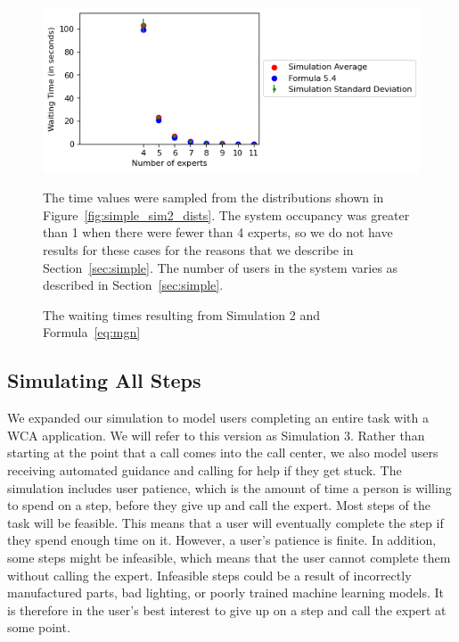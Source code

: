 \begin{figure}[h]
  \includegraphics{figures/montecarlo/independent_calls_lognorm.png}
  \begin{captiontext}
    The time values were sampled from the distributions shown in
    Figure~\ref{fig:simple_sim2_dists}.
    The system occupancy was greater than 1 when there were fewer than 4
    experts, so we do not have results for these cases for the reasons that we
    describe in Section~\ref{sec:simple}.
    The number of users in the system varies as described in
    Section~\ref{sec:simple}.
  \end{captiontext}
  \caption{
    The waiting times resulting from Simulation 2 and Formula~\ref{eq:mgn}
  }\label{fig:simple_sim2_results}
\end{figure}

\subsection{Simulating All Steps}

We expanded our simulation to model users completing an entire task with a WCA
application.
We will refer to this version as Simulation 3.
Rather than starting at the point that a call comes into the call center, we
also model users receiving automated guidance and calling for help if they get
stuck.
The simulation includes user patience, which is the amount of time a person is
willing to spend on a step, before they give up and call the expert.
Most steps of the task will be feasible.
This means that a user will eventually complete the step if they spend enough
time on it.
However, a user's patience is finite.
In addition, some steps might be infeasible, which means that the user cannot
complete them without calling the expert.
Infeasible steps could be a result of incorrectly manufactured parts, bad
lighting, or poorly trained machine learning models.
It is therefore in the user's best interest to give up on a step and call the
expert at some point.


